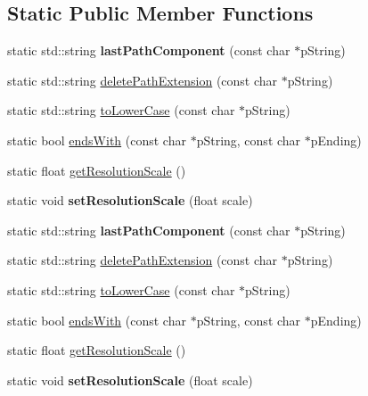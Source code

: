 \subsection*{Static Public Member Functions}
\begin{DoxyCompactItemize}
\item 
\mbox{\label{classcocosbuilder_1_1CCBReader_aaa66b8f76d3da55fda7a03a49682725d}} 
static std\+::string {\bfseries last\+Path\+Component} (const char $\ast$p\+String)
\item 
static std\+::string \hyperlink{classcocosbuilder_1_1CCBReader_aa4b85cdeb60157c3c33edc8ae3fb7949}{delete\+Path\+Extension} (const char $\ast$p\+String)
\item 
static std\+::string \hyperlink{classcocosbuilder_1_1CCBReader_a3cc1d027b3f73fd024be9681fa6e370b}{to\+Lower\+Case} (const char $\ast$p\+String)
\item 
static bool \hyperlink{classcocosbuilder_1_1CCBReader_a8174919874c91c8ee6cea3f5cf78a9dc}{ends\+With} (const char $\ast$p\+String, const char $\ast$p\+Ending)
\item 
static float \hyperlink{classcocosbuilder_1_1CCBReader_a6ab0ec865e9a17fa106f2493f2681eeb}{get\+Resolution\+Scale} ()
\item 
\mbox{\label{classcocosbuilder_1_1CCBReader_a7f3e58d543ef0fbe9e753b7ae3417288}} 
static void {\bfseries set\+Resolution\+Scale} (float scale)
\item 
\mbox{\label{classcocosbuilder_1_1CCBReader_a6687b8b01db444be22db9b3c37d9bc1f}} 
static std\+::string {\bfseries last\+Path\+Component} (const char $\ast$p\+String)
\item 
static std\+::string \hyperlink{classcocosbuilder_1_1CCBReader_ab72a39f7c6f48af9d21af73ffd2b3657}{delete\+Path\+Extension} (const char $\ast$p\+String)
\item 
static std\+::string \hyperlink{classcocosbuilder_1_1CCBReader_a00b8f2a4ea66108ac0d78e6861014d3f}{to\+Lower\+Case} (const char $\ast$p\+String)
\item 
static bool \hyperlink{classcocosbuilder_1_1CCBReader_a1db8b384e8c21c3492e6425c883e9cd3}{ends\+With} (const char $\ast$p\+String, const char $\ast$p\+Ending)
\item 
static float \hyperlink{classcocosbuilder_1_1CCBReader_a353b6d12dfa69780ad667c1ad3fa4e84}{get\+Resolution\+Scale} ()
\item 
\mbox{\label{classcocosbuilder_1_1CCBReader_a68dcd8071fb677a15ce0b0accc916e46}} 
static void {\bfseries set\+Resolution\+Scale} (float scale)
\end{DoxyCompactItemize}
